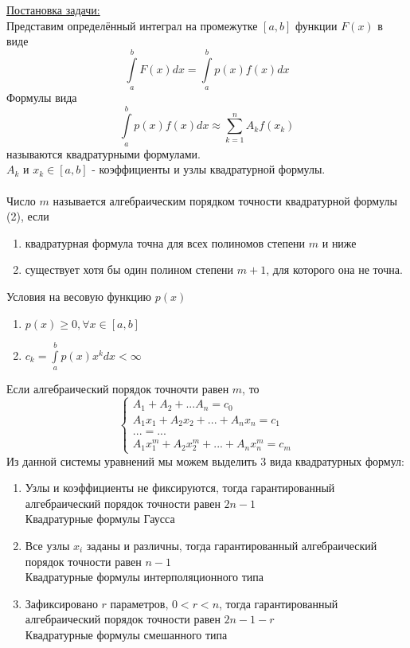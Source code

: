 \documentclass{article}
\begin{document}
	\underline{Постановка задачи:}\\
	Представим определённый интеграл на промежутке $[a,b]$ функции $F(x)$ в виде
	\begin{equation}
		\int\limits_{a}^{b}F(x)dx = \int\limits_{a}^{b}p(x)f(x)dx
	\end{equation}
	Формулы вида
	\begin{equation}
		\int\limits_{a}^{b}p(x)f(x)dx \approx \sum_{k=1}^{n}A_kf(x_k)
	\end{equation}
	называются квадратурными формулами.\\
	$A_k$ и $x_k \in [a,b]$ - коэффициенты и узлы квадратурной формулы.\\
	\\
	Число $m$ называется алгебраическим порядком точности квадратурной формулы (2), если 
	\begin{enumerate}
		\item квадратурная формула точна для всех полиномов степени $m$ и ниже
		\item существует хотя бы один полином степени $m+1$, для которого она не точна.
	\end{enumerate}
	Условия на весовую функцию $p(x)$
	\begin{enumerate}
		\item $p(x) \geq 0, \forall x \in [a,b]$
		\item $c_k = \int\limits_{a}^{b}p(x)x^kdx < \infty$
	\end{enumerate}
	Если алгебраический порядок точночти равен $m$, то
	\begin{equation}
		\begin{cases}
			A_1+A_2+...A_n = c_0\\
			A_1x_1+A_2x_2+...+A_nx_n = c_1\\
			... = ...\\
			A_1x_1^m+A_2x_2^m+...+A_nx_n^m = c_m
		\end{cases}
	\end{equation}
	Из данной системы уравнений мы можем выделить 3 вида квадратурных формул:
	\begin{enumerate}
		\item Узлы и коэффициенты не фиксируются, тогда гарантированный алгебраический порядок точности равен $2n-1$\\
		Квадратурные формулы Гаусса
		\item Все узлы $x_i$ заданы и различны, тогда гарантированный алгебраический порядок точности равен $n-1$\\ 
		Квадратурные формулы интерполяционного типа
		\item Зафиксировано $r$ параметров, $0<r<n$, тогда гарантированный алгебраический порядок точности равен $2n-1-r$\\
		Квадратурные формулы смешанного типа
	\end{enumerate}
\end{document}
